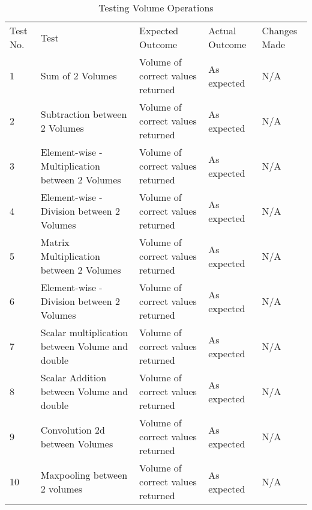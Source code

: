 \begin{table}[H]
\centering
    \begin{tabular}{|p{1cm}|p{4cm}|p{4cm}|p{3cm}|p{2cm}|}
        \hline
        Test No. & Test & Expected Outcome & Actual Outcome & Changes Made \\ \cline{1-5} 
        1 & Sum of 2 Volumes & Volume of correct values returned & As expected & N/A \\
        \cline{1-5}
        2 & Subtraction between 2 Volumes & Volume of correct values returned & As expected & N/A \\
        \cline{1-5}
        3 & Element-wise - Multiplication between 2 Volumes & Volume of correct values returned & As expected & N/A \\
        \cline{1-5}
        4 & Element-wise - Division between 2 Volumes & Volume of correct values returned & As expected & N/A \\
        \cline{1-5}
        5 & Matrix Multiplication between 2 Volumes & Volume of correct values returned & As expected & N/A \\
        \cline{1-5}
        6 & Element-wise - Division between 2 Volumes & Volume of correct values returned & As expected & N/A \\
        \cline{1-5}
        7 & Scalar multiplication between Volume and double & Volume of correct values returned & As expected & N/A \\
        \cline{1-5}
        8 & Scalar Addition between Volume and double & Volume of correct values returned & As expected & N/A \\
        \cline{1-5}
        9 & Convolution 2d between Volumes & Volume of correct values returned & As expected & N/A \\
        \cline{1-5}
        10 & Maxpooling between 2 volumes & Volume of correct values returned & As expected & N/A \\
        \cline{1-5}
    \end{tabular}
    \caption{Testing Volume Operations}
    \vspace{0.5cm}
\end{table}

